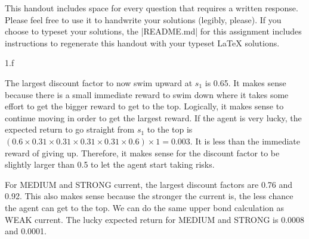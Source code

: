 


\def\assignmentnum{1 }
\def\assignmenttitle{XCS234 Assignment \assignmentnum}


\pagestyle{myheadings} \markboth{}{\assignmenttitle}


This handout includes space for every question that requires a written response.
Please feel free to use it to handwrite your solutions (legibly, please).  If
you choose to typeset your solutions, the |README.md| for this assignment includes
instructions to regenerate this handout with your typeset \LaTeX{} solutions.

\LARGE
1.f
\normalsize

\begin{answer}
  The largest discount factor to now swim upward at $s_1$ is 0.65. It makes sense because there is a small immediate reward to swim down where it takes some effort to get the bigger reward to get to the top. Logically, it makes sense to continue moving in order to get the largest reward. If the agent is very lucky, the expected return to go straight from $s_1$ to the top is $(0.6 \times 0.31 \times 0.31 \times 0.31 \times 0.31 \times 0.6) \times 1 = 0.003$. It is less than the immediate reward of giving up. Therefore, it makes sense for the discount factor to be slightly larger than 0.5 to let the agent start taking risks.

  For MEDIUM and STRONG current, the largest discount factors are 0.76 and 0.92. This also makes sense because the stronger the current is, the less chance the agent can get to the top. We can do the same upper bond calculation as WEAK current. The lucky expected return for MEDIUM and STRONG is 0.0008 and 0.0001.
\end{answer}
\clearpage


